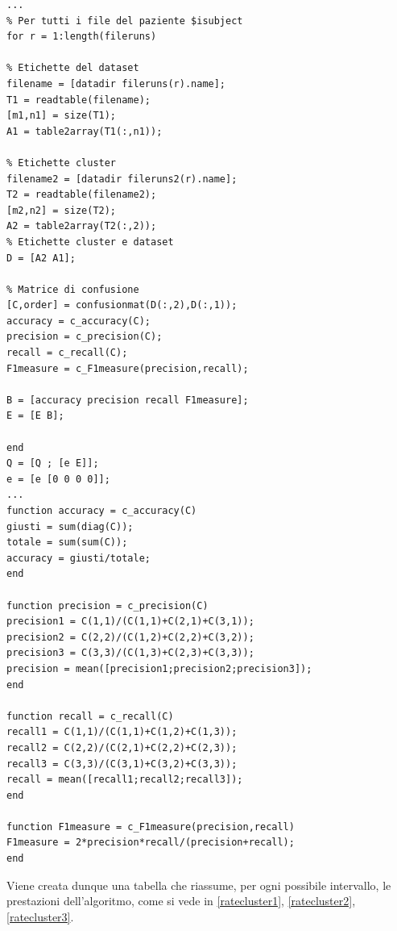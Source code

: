 \begin{lstlisting}[style=Matlab-editor,frame=single, caption=Calcolo delle prestazioni, label=rate]  % Start your code-block
...
% Per tutti i file del paziente $isubject
for r = 1:length(fileruns)

% Etichette del dataset
filename = [datadir fileruns(r).name];
T1 = readtable(filename);
[m1,n1] = size(T1);
A1 = table2array(T1(:,n1));

% Etichette cluster
filename2 = [datadir fileruns2(r).name];
T2 = readtable(filename2);
[m2,n2] = size(T2);
A2 = table2array(T2(:,2));
% Etichette cluster e dataset
D = [A2 A1];

% Matrice di confusione
[C,order] = confusionmat(D(:,2),D(:,1));
accuracy = c_accuracy(C);
precision = c_precision(C);
recall = c_recall(C);
F1measure = c_F1measure(precision,recall);

B = [accuracy precision recall F1measure];
E = [E B];

end
Q = [Q ; [e E]];
e = [e [0 0 0 0]];
...
function accuracy = c_accuracy(C)
giusti = sum(diag(C));
totale = sum(sum(C));
accuracy = giusti/totale;
end

function precision = c_precision(C)
precision1 = C(1,1)/(C(1,1)+C(2,1)+C(3,1));
precision2 = C(2,2)/(C(1,2)+C(2,2)+C(3,2));
precision3 = C(3,3)/(C(1,3)+C(2,3)+C(3,3));
precision = mean([precision1;precision2;precision3]);
end

function recall = c_recall(C)
recall1 = C(1,1)/(C(1,1)+C(1,2)+C(1,3));
recall2 = C(2,2)/(C(2,1)+C(2,2)+C(2,3));
recall3 = C(3,3)/(C(3,1)+C(3,2)+C(3,3));
recall = mean([recall1;recall2;recall3]);
end

function F1measure = c_F1measure(precision,recall)
F1measure = 2*precision*recall/(precision+recall);
end
\end{lstlisting}
Viene creata dunque una tabella che riassume, per ogni possibile intervallo, le prestazioni dell'algoritmo, come si vede in \ref{ratecluster1}, \ref{ratecluster2}, \ref{ratecluster3}.
\begin{table}[htp]
	\centering
	\caption{Esempio di tabelle delle prestazioni del clustering}
	\label{ratecluster1}
\end{table}
